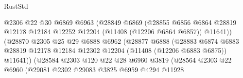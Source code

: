 \begin{lexlean}{RustStd}
\begin{coremodule}
                                      @2306
                                      @22
                                      @30
                                      @6869
                                      @6963
                                      (@28849
                                        @6869
                                        (@28855
                                          @6856
                                          @6864
                                          @28819
                                          @12178
                                          @12184
                                          @12252
                                          @12204
                                          (@11408 (@12206 @6864 @6857))
                                          @11641))
                                      (@28870
                                        @2305
                                        @25
                                        @29
                                        @6888
                                        @6962
                                        (@28877
                                          @6888
                                          (@28883
                                            @6874
                                            @6883
                                            @28819
                                            @12178
                                            @12184
                                            @12302
                                            @12204
                                            (@11408 (@12206 @6883 @6875))
                                            @11641))
                                        (@28584
                                          @2303
                                          @120
                                          @22
                                          @28
                                          @6960
                                          @3819
                                          (@28564
                                            @2303
                                            @22
                                            @6960
                                            (@29081
                                              @2302
                                              @29083
                                              @3825
                                              @6959
                                              @4294
                                              @11928

\end{coremodule}
\end{lexlean}

